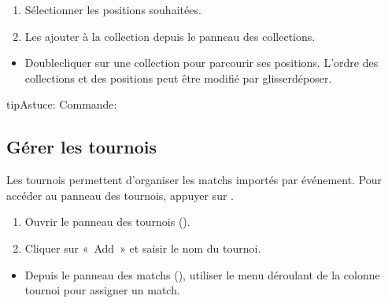 \documentclass[letterpaper,10pt,french]{sphinxmanual}
\begin{document}
\sphinxAtStartPar
{}
\begin{enumerate}
%
\item {} 
\sphinxAtStartPar
Sélectionner les positions souhaitées.

\item {} 
\sphinxAtStartPar
Les ajouter à la collection depuis le panneau des collections.

\end{enumerate}

\sphinxAtStartPar
{}
\begin{itemize}
\item {} 
\sphinxAtStartPar
Double\sphinxhyphen{}cliquer sur une collection pour parcourir ses positions.
L’ordre des collections et des positions peut être modifié par
glisser\sphinxhyphen{}déposer.

\end{itemize}

\begin{sphinxadmonition}{tip}{Astuce:}
\sphinxAtStartPar
Commande: 
\end{sphinxadmonition}


\subsection{Gérer les tournois}
\label{\detokenize{guide_utilisateur:gerer-les-tournois}}
\sphinxAtStartPar
Les tournois permettent d’organiser les matchs importés par événement.
Pour accéder au panneau des tournois, appuyer sur .

\sphinxAtStartPar
{}
\begin{enumerate}
%
\item {} 
\sphinxAtStartPar
Ouvrir le panneau des tournois ().

\item {} 
\sphinxAtStartPar
Cliquer sur « Add » et saisir le nom du tournoi.

\end{enumerate}

\sphinxAtStartPar
{}
\begin{itemize}
\item {} 
\sphinxAtStartPar
Depuis le panneau des matchs (), utiliser le menu déroulant
de la colonne tournoi pour assigner un match.

\end{itemize}
\end{document}
